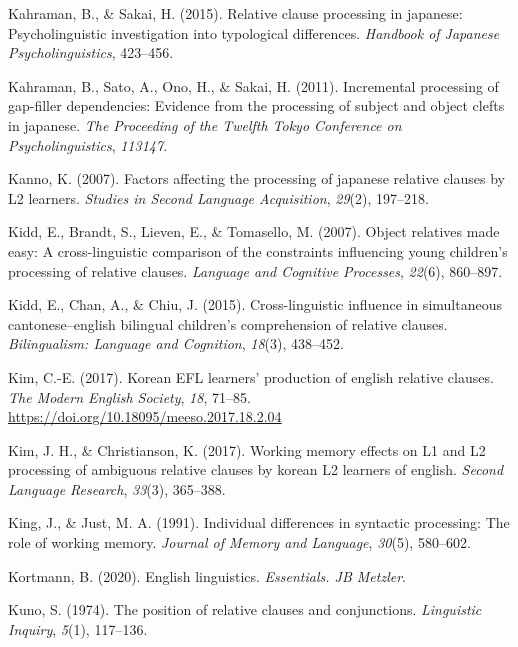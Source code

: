 \documentclass[
]{article}
\newlength{\cslhangindent}
\newenvironment{CSLReferences}[2] %
 {\begin{list}{}{%
  \setlength{\itemindent}{0pt}
  \setlength{\leftmargin}{0pt}
  \setlength{\parsep}{0pt}
  \ifodd #1
   \setlength{\leftmargin}{\cslhangindent}
   \setlength{\itemindent}{-1\cslhangindent}
  \fi
  \setlength{\itemsep}{#2\baselineskip}}}
 {\end{list}}
\begin{document}
\begin{CSLReferences}{1}{0}
Kahraman, B., \& Sakai, H. (2015). Relative clause processing in
japanese: Psycholinguistic investigation into typological differences.
\emph{Handbook of Japanese Psycholinguistics}, 423--456.

Kahraman, B., Sato, A., Ono, H., \& Sakai, H. (2011). Incremental
processing of gap-filler dependencies: Evidence from the processing of
subject and object clefts in japanese. \emph{The Proceeding of the
Twelfth Tokyo Conference on Psycholinguistics}, \emph{113147}.

Kanno, K. (2007). Factors affecting the processing of japanese relative
clauses by L2 learners. \emph{Studies in Second Language Acquisition},
\emph{29}(2), 197--218.

Kidd, E., Brandt, S., Lieven, E., \& Tomasello, M. (2007). Object
relatives made easy: A cross-linguistic comparison of the constraints
influencing young children's processing of relative clauses.
\emph{Language and Cognitive Processes}, \emph{22}(6), 860--897.

Kidd, E., Chan, A., \& Chiu, J. (2015). Cross-linguistic influence in
simultaneous cantonese--english bilingual children's comprehension of
relative clauses. \emph{Bilingualism: Language and Cognition},
\emph{18}(3), 438--452.

Kim, C.-E. (2017). Korean EFL learners' production of english relative
clauses. \emph{The Modern English Society}, \emph{18}, 71--85.
\url{https://doi.org/10.18095/meeso.2017.18.2.04}

Kim, J. H., \& Christianson, K. (2017). Working memory effects on L1 and
L2 processing of ambiguous relative clauses by korean L2 learners of
english. \emph{Second Language Research}, \emph{33}(3), 365--388.

King, J., \& Just, M. A. (1991). Individual differences in syntactic
processing: The role of working memory. \emph{Journal of Memory and
Language}, \emph{30}(5), 580--602.

Kortmann, B. (2020). English linguistics. \emph{Essentials. JB Metzler}.

Kuno, S. (1974). The position of relative clauses and conjunctions.
\emph{Linguistic Inquiry}, \emph{5}(1), 117--136.


\end{CSLReferences}
\end{document}
